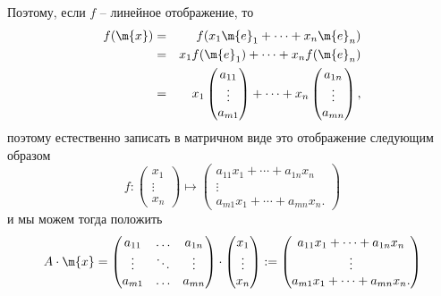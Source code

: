 Поэтому, если $f$ -- линейное отображение, то
\begin{eqnarray*}
    f(\m{x}) &=& f(x_1 \m{e}_1 + \cdots + x_n \m{e}_n) \\
    &=& x_1 f(\m{e}_1) + \cdots + x_n f(\m{e}_n) \\
    &=& x_1 \begin{pmatrix}
     a_{11} \\ \vdots \\ a_{m1}
 \end{pmatrix} + \cdots + x_n \begin{pmatrix}
     a_{1n} \\ \vdots \\ a_{mn}
 \end{pmatrix},
\end{eqnarray*}
поэтому естественно записать в матричном виде это отображение следующим образом
\[
 f: \begin{pmatrix}
     x_1 \\ 
     \vdots \\
     x_n
 \end{pmatrix} \mapsto \begin{pmatrix}
     a_{11} x_1 + \cdots + a_{1n}x_n \\
     \vdots \\
     a_{m1}x_1 + \cdots + a_{mn}x_n.
 \end{pmatrix}
\]
и мы можем тогда положить
\[
 A\cdot \m{x} = \begin{pmatrix}
    a_{11} & \ldots & a_{1n} \\
    \vdots & \ddots & \vdots \\
    a_{m1} & \ldots & a_{mn}
\end{pmatrix} \cdot \begin{pmatrix}
     x_1 \\ 
     \vdots \\
     x_n
 \end{pmatrix} : = \begin{pmatrix}
     a_{11} x_1 + \cdots + a_{1n}x_n \\
     \vdots \\
     a_{m1}x_1 + \cdots + a_{mn}x_n.
 \end{pmatrix}
 \]

